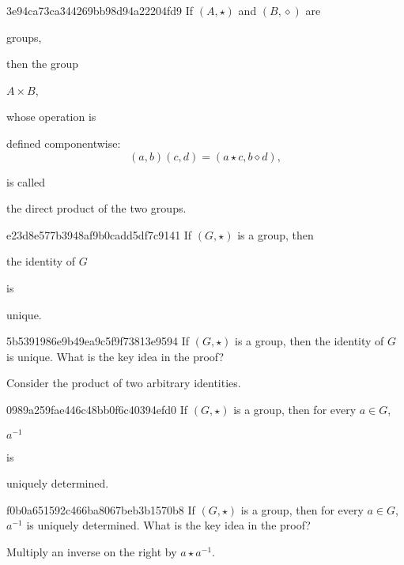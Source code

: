 \begin{note}{3e94ca73ca344269bb98d94a22204fd9}
    If \({ (A, \star) }\) and \({ (B, \diamond) }\) are \begin{icloze}{4}groups,\end{icloze} then the group \begin{icloze}{2}\({ A \times B }\),\end{icloze} whose operation is
    \begin{icloze}{1}
        defined componentwise:
        \[
            (a, b)(c, d) = (a \star c, b \diamond d),
        \]
    \end{icloze}
    is called \begin{icloze}{3}the direct product of the two groups.\end{icloze}
\end{note}

\begin{note}{e23d8e577b3948af9b0cadd5df7c9141}
    If \({ (G, \star) }\) is a group, then \begin{icloze}{2}the identity of \({ G }\)\end{icloze} is \begin{icloze}{1}unique.\end{icloze}
\end{note}

\begin{note}{5b5391986e9b49ea9c5f9f73813e9594}
    If \({ (G, \star) }\) is a group, then the identity of \({ G }\) is unique.
    What is the key idea in the proof?

    \begin{cloze}{1}
        Consider the product of two arbitrary identities.
    \end{cloze}
\end{note}

\begin{note}{0989a259fae446c48bb0f6c40394efd0}
    If \({ (G, \star) }\) is a group, then for every \({ a \in G }\), \begin{icloze}{2}\({ a^{-1} }\)\end{icloze} is \begin{icloze}{1}uniquely determined.\end{icloze}
\end{note}

\begin{note}{f0b0a651592c466ba8067beb3b1570b8}
    If \({ (G, \star) }\) is a group, then for every \({ a \in G }\), \({ a^{-1} }\) is uniquely determined.
    What is the key idea in the proof?

    \begin{cloze}{1}
        Multiply an inverse on the right by \({ a \star a^{-1} }\).
    \end{cloze}
\end{note}

